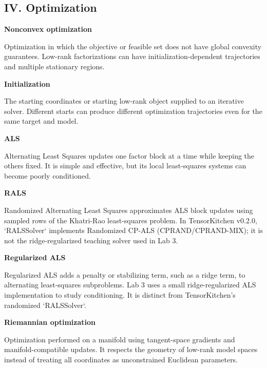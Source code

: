 \documentclass[10pt]{article}
\newenvironment{glossaryentry}[1]{%
  \par\medskip\noindent
  {\large\bfseries #1}\par\smallskip
}{\par\medskip}
\begin{document}
\subsection{IV. Optimization}

\begin{glossaryentry}{Nonconvex optimization}
Optimization in which the objective or feasible set does not have global convexity guarantees. Low-rank factorizations can have initialization-dependent trajectories and multiple stationary regions.

\end{glossaryentry}


\begin{glossaryentry}{Initialization}
The starting coordinates or starting low-rank object supplied to an iterative solver. Different starts can produce different optimization trajectories even for the same target and model.
\par\smallskip{\small\color{muted}[KB09]}
\end{glossaryentry}


\begin{glossaryentry}{ALS}
Alternating Least Squares updates one factor block at a time while keeping the others fixed. It is simple and effective, but its local least-squares systems can become poorly conditioned.
\par\smallskip{\small\color{muted}[KB09]}
\end{glossaryentry}


\begin{glossaryentry}{RALS}
Randomized Alternating Least Squares approximates ALS block updates using sampled rows of the Khatri-Rao least-squares problem. In TensorKitchen v0.2.0, `RALSSolver` implements Randomized CP-ALS (CPRAND/CPRAND-MIX); it is not the ridge-regularized teaching solver used in Lab 3.

\end{glossaryentry}


\begin{glossaryentry}{Regularized ALS}
Regularized ALS adds a penalty or stabilizing term, such as a ridge term, to alternating least-squares subproblems. Lab 3 uses a small ridge-regularized ALS implementation to study conditioning. It is distinct from TensorKitchen's randomized `RALSSolver`.

\end{glossaryentry}


\begin{glossaryentry}{Riemannian optimization}
Optimization performed on a manifold using tangent-space gradients and manifold-compatible updates. It respects the geometry of low-rank model spaces instead of treating all coordinates as unconstrained Euclidean parameters.
\par\smallskip{\small\color{muted}[AMS08]}
\end{glossaryentry}
\end{document}
